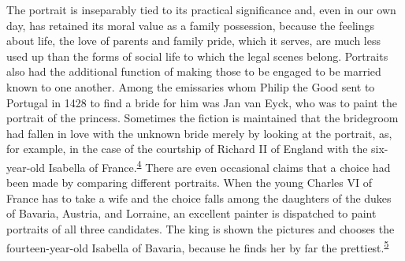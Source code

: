 \protect\hypertarget{20_ILLUSTRATIONS_FOLLOW_PAGE.xhtmlux5cux23id_3177}{}{}The
portrait is inseparably tied to its practical significance and, even in
our own day, has retained its moral value as a family possession,
because the feelings about life, the love of parents and family pride,
which it serves, are much less used up than the forms of social life to
which the legal scenes belong. Portraits also had the additional
function of making those to be engaged to be married known to one
another. Among the emissaries whom Philip the Good sent to Portugal in
1428 to find a bride for him was Jan van Eyck, who was to paint the
portrait of the princess. Sometimes
\protect\hypertarget{20_ILLUSTRATIONS_FOLLOW_PAGE.xhtmlux5cux23page_298}{}{}the
fiction is maintained that the bridegroom had fallen in love with the
unknown bride merely by looking at the portrait, as, for example, in the
case of the courtship of Richard II of England with the six-year-old
Isabella of
France.\textsuperscript{\protect\hypertarget{20_ILLUSTRATIONS_FOLLOW_PAGE.xhtmlux5cux23id_464}{\protect\hyperlink{23_NOTES.xhtmlux5cux23id_465}{4}}}
There are even occasional claims that a choice had been made by
comparing different portraits. When the young Charles VI of France has
to take a wife and the choice falls among the daughters of the dukes of
Bavaria, Austria, and Lorraine, an excellent painter is dispatched to
paint portraits of all three candidates. The king is shown the pictures
and chooses the fourteen-year-old Isabella of Bavaria, because he finds
her by far the
prettiest.\textsuperscript{\protect\hypertarget{20_ILLUSTRATIONS_FOLLOW_PAGE.xhtmlux5cux23id_462}{\protect\hyperlink{23_NOTES.xhtmlux5cux23id_463}{5}}}

